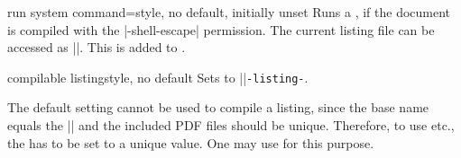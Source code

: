 \begin{docTcbKey}[][doc new=2014-11-14]{run system command}{=}{style, no default, initially unset}
Runs a , if the document is compiled with the
|-shell-escape| permission.
The current listing file can be accessed as |\filename@area\filename@base\filename@ext|.
This  is added to .
\end{docTcbKey}


\begin{docTcbKey}[][doc new and updated={2014-11-14}{2016-05-27}]{compilable listing}{}{style, no default}
  Sets  to |\jobname|\texttt{-listing-}.
  \begin{marker}
  The default  setting cannot be used to compile
  a listing, since the base name equals the |\jobname| and the included PDF
  files should be unique.
  Therefore, to use  etc., the 
  has to be set to a unique value.
  One may use  for this purpose.
  \end{marker}
\end{docTcbKey}



